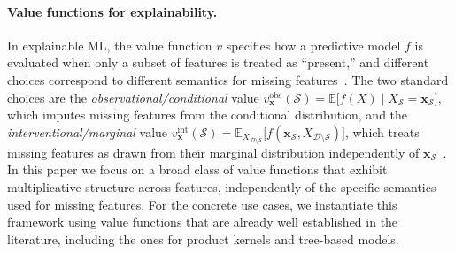 \documentclass{article}
\newcommand{\cD}{\mathcal{D}}
\newcommand{\cS}{\mathcal{S}}
\newcommand{\E}{\mathbb{E}}
\newcommand{\x}{\mathbf{x}}
\begin{document}
\paragraph{Value functions for explainability.}
In explainable ML, the value function $v$ specifies how a predictive model $f$ is evaluated when only a subset of features is treated as ``present,'' and different choices correspond to different semantics for missing features~\citep{many_sv,shap_book}.
The two standard choices are the \emph{observational/conditional} value
$v_{\x}^{\mathrm{obs}}(\cS) = \E\bigl[f(X)\mid X_{\cS} = \x_{\cS}\bigr]$,
which imputes missing features from the conditional distribution, and the \emph{interventional/marginal} value
$v_{\x}^{\mathrm{int}}(\cS) = \E_{X_{\cD\setminus\cS}}\bigl[f(\x_{\cS}, X_{\cD\setminus\cS})\bigr]$,
which treats missing features as drawn from their marginal distribution independently of $\x_{\cS}$~\citep{interventional_shap,chen2020true,causal_shap}.
In this paper we focus on a broad class of value functions that exhibit multiplicative structure across features, independently of the specific semantics used for missing features. For the concrete use cases, we instantiate this framework using value functions that are already well established in the literature, including the ones for product kernels and tree-based models.







\end{document}
